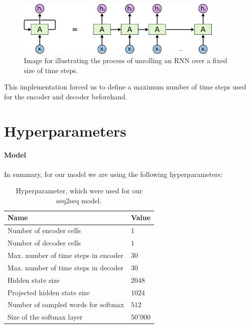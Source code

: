 \begin{figure}
	\label{methods:static_unrolling:unrolled_rnn}
	\centering
	\includegraphics[width=10cm]{img/rnn_unrolled}
	\caption{Image for illustrating the process of unrolling an RNN over a fixed size of time steps.\protect\footnotemark}
\end{figure}

This implementation forced us to define a maximum number of time steps used for the encoder and decoder beforehand.

\section{Hyperparameters}
\label{methods:hyperparameters}

\paragraph{Model} In summary, for our model we are using the following hyperparameters:

\begin{table}[H]
	\centering
	\begin{adjustbox}{max width=\textwidth}
		\begin{tabular}{ll}
			\toprule
			Name & Value\\ \midrule
			Number of encoder cells & $1$\\
			Number of decoder cells & $1$\\
			Max. number of time steps in encoder & $30$\\
			Max. number of time steps in decoder & $30$\\
			Hidden state size & $2048$\\
			Projected hidden state size & $1024$\\
			Number of sampled words for softmax & $512$\\
			Size of the softmax layer & $50'000$\\
			\bottomrule
		\end{tabular}
	\end{adjustbox}
	\caption{Hyperparameter, which were used for our seq2seq model.}
	\label{methods:hyperparameters:table}
\end{table}

